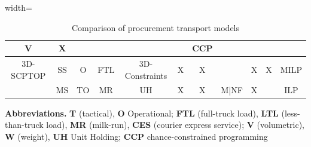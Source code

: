 \begin{table}[h!]
\begin{adjustbox}{width=\textwidth}
\begin{tabular}{|c|c|c|c|c|c|c|l|c|c|c|}
      V                                                                                  &
      X                                                                                  &
                                                                                         &                &
                                                                                         &
                                                                                         &
      CCP                                                                                                                                               \\ \hline
      3D-SCPTOP                                                                          &
      SS                                                                                 &
      O                                                                                  &
      FTL                                                                                &
      3D-Constraints                                                                     &
      X                                                                                  &
      X                                                                                  &                &
      X                                                                                  &
      X                                                                                  &
      MILP                                                                                                                                              \\ \hline
      \autocite{Zhang17012024}                                                           & MS             & TO & MR  & UH & X & X & M|NF & X &  & ILP   \\\hline
    \end{tabular}
  \end{adjustbox}
  \begin{tablenotes}
    \scriptsize
    \item  \textbf{Abbreviations.}  \textbf{T} (tactical), \textbf{O} Operational; \textbf{FTL} (full-truck load), \textbf{LTL} (less-than-truck load), \textbf{MR} (milk-run), \textbf{CES} (courier express service); \textbf{V} (volumetric), \textbf{W} (weight), \textbf{UH} Unit Holding;   \textbf{CCP} chance-constrained programming
  \end{tablenotes}
  \caption{Comparison of procurement transport models}
  \label{table:ComProTra}
\end{table}

